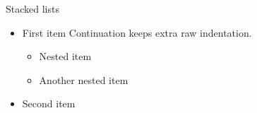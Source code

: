\begin{frame}{Stacked lists}
\begin{center}
\begin{itemize}
\item<1->[A] First item
  Continuation keeps extra raw indentation.
\begin{itemize}
\item Nested item
\item Another nested item
\end{itemize}
\item<2-> Second item
\end{itemize}
\end{center}
\end{frame}
